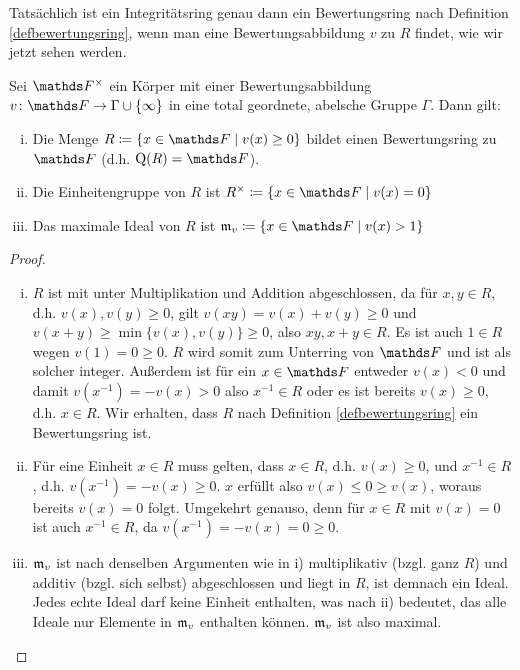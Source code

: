 \documentclass[ngerman,fontsize=11pt, paper=a4, parskip=half, titlepage=true, toc=bib]{scrartcl}
\begin{document}
Tatsächlich ist ein Integritätsring genau dann
ein Bewertungsring nach Definition \ref{defbewertungsring},
wenn man eine Bewertungsabbildung $v$ zu $R$ findet,
wie wir jetzt sehen werden.

\begin{Lem}\label{bewertungsringausbewertung}
  Sei $\Fx$ ein Körper mit einer Bewertungsabbildung
  $v\colon\F\to\Gamma\cup\{\infty\}$ in eine total geordnete, abelsche Gruppe
  $\Gamma$. Dann gilt:
  \begin{enumerate}[i)]
  \item   Die Menge $R\coloneqq\left\{x\in \F\mid  v(x)\geq 0\right\}$ bildet
    einen Bewertungsring zu $\F$ (d.h. $\Quot(R)=\F$).
  \item Die Einheitengruppe von $R$ ist 
    $\Rx\coloneqq\left\{x\in\F\mid v(x)=0\right\}$
  \item Das maximale Ideal von $R$ ist
    $\frakm_v\coloneqq\left\{x\in\F\mid v(x)>1\right\}$
  \end{enumerate}

  \begin{proof}
    \begin{enumerate}[i)]
    \item $R$ ist mit unter Multiplikation und Addition abgeschlossen, da für
      $x,y\in R$, d.h. $v(x),v(y)\geq 0$, 
      gilt $v(xy)=v(x)+v(y)\geq 0$ und 
      $v(x+y)\geq \min\{v(x),v(y)\}\geq 0$, also $xy, x+y\in R$.
      Es ist auch $1\in R$ wegen $v(1)=0\geq 0$.
      $R$ wird somit  zum Unterring von $\F$ und ist als solcher integer.
      Außerdem ist für ein $x\in \F$ entweder $v(x)<0$
      und damit $v(x^{-1})=-v(x)>0$ also $x^{-1}\in R$ oder es ist
      bereits $v(x)\geq 0$, d.h. $x\in R$.
      Wir erhalten, dass $R$ nach Definition \ref{defbewertungsring}
      ein Bewertungsring ist.
    \item Für eine Einheit $x\in R$ muss gelten, dass $x\in R$,
      d.h. $v(x)\geq 0$, und $x^{-1}\in R$, d.h. $v(x^{-1})=-v(x)\geq 0$. 
      $x$ erfüllt also $v(x)\leq 0 \geq v(x)$, woraus bereits $v(x)=0$
      folgt.
      Umgekehrt genauso, denn für $x\in R$ mit $v(x)=0$ ist auch
      $x^{-1}\in R$, da $v(x^{-1})=-v(x)=0\geq 0$.
    \item $\mathfrak{m}_v$ ist nach denselben Argumenten wie in i)
      multiplikativ (bzgl. ganz $R$) und additiv (bzgl. sich selbst)
      abgeschlossen und liegt in $R$, ist demnach ein Ideal.
      Jedes echte Ideal darf keine Einheit enthalten, was nach ii) bedeutet,
      das alle Ideale nur Elemente in $\mathfrak{m}_v$ enthalten
      können. $\mathfrak{m}_v$ ist also maximal.
    \end{enumerate}
  \end{proof}
\end{Lem}
\end{document}

